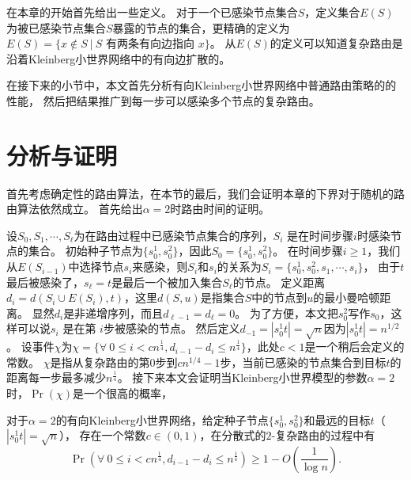 在本章的开始首先给出一些定义。
对于一个已感染节点集合$S$，定义集合$E(S)$为被已感染节点集合$S$暴露的节点的集合，更精确的定义为
$E(S) = \{x\notin S\ |\ S \mbox{ 有两条有向边指向 } x\}$。
从$E(S)$的定义可以知道复杂路由是沿着Kleinberg小世界网络中的有向边扩散的。

在接下来的小节中，本文首先分析有向Kleinberg小世界网络中普通路由策略的的性能，
然后把结果推广到每一步可以感染多个节点的复杂路由。



\section{分析与证明}
首先考虑确定性的路由算法，在本节的最后，我们会证明本章的下界对于随机的路由算法依然成立。
首先给出$\alpha = 2$时路由时间的证明。

设$S_0, S_1,\cdots, S_{\ell}$为在路由过程中已感染节点集合的序列，$S_i$ 是在时间步骤$i$时感染节点的集合。
初始种子节点为$\{s_0^1,s_0^2\}$，因此$S_0 = \{s_0^1,s_0^2\}$。
在时间步骤$i \geq 1$，我们从$E(S_{i-1})$中选择节点$s_{i}$来感染，则$S_i$和$s_i$的关系为$S_i = \{s_0^1,s_0^2,s_1,\cdots,s_{i}\}$，
由于$t$最后被感染了，$s_{\ell}=t$是最后一个被加入集合$S_{\ell}$的节点。
定义距离$d_i = d(S_i \cup E(S_i),t)$，这里$d(S,u)$是指集合$S$中的节点到$u$的最小曼哈顿距离。
显然$d_i$是非递增序列，而且$d_{\ell-1} = d_{\ell}= 0$。
为了方便，本文把$s_0^2$写作$s_0$，这样可以说$s_i$ 是在第 $i$步被感染的节点。
然后定义$d_{-1} = |s_0^1t| = \sqrt{n}$因为$|s_0^1t| = n^{1/2}$。
设事件$\chi$为$\chi = \{\forall~0 \leq i < cn^{\frac{1}{4}}, d_{i-1}-d_{i}\leq n^{\frac{1}{4}}\}$，此处$c<1$是一个稍后会定义的常数。
$\chi$是指从复杂路由的第$0$步到$cn^{1/4}-1$步，当前已感染的节点集合到目标$t$的距离每一步最多减少$n^{\frac{1}{4}}$。
接下来本文会证明当Kleinberg小世界模型的参数$\alpha = 2$时，$\Pr(\chi)$是一个很高的概率，



\begin{lemma}
\label{lem:routing}
对于$\alpha = 2$的有向Kleinberg小世界网络，给定种子节点$\{s_0^1,s_0^2\}$和最远的目标$t$（$|s_0^1t| = \sqrt{n}$），
存在一个常数$c \in (0,1)$，在分散式的$2$-复杂路由的过程中有
$$\Pr(\forall~0 \leq i < cn^{\frac{1}{4}}, d_{i-1}-d_{i}\leq n^{\frac{1}{4}})\geq 1-O(\frac{1}{\log n}).$$
\end{lemma}

